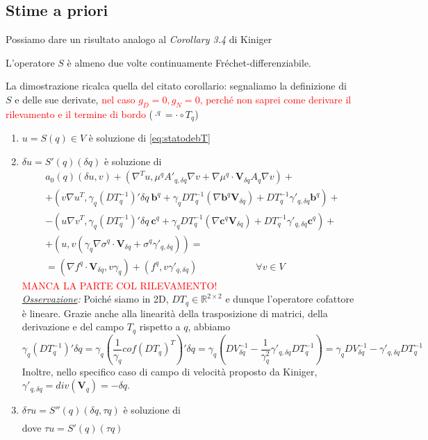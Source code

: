 \subsection{Stime a priori}
Possiamo dare un risultato analogo al \emph{Corollary 3.4} di Kiniger
\begin{prop} L'operatore $S$ \`e almeno due volte continuamente Fr\'echet-differenziabile.
\end{prop}
La dimostrazione ricalca quella del citato corollario: segnaliamo la definizione di $S$ e delle sue derivate, \textcolor{red}{nel caso $g_D=0, g_N=0$, perch\'e non saprei come derivare il rilevamento e il termine di bordo} ($\cdot^q = \cdot\circ T_q$)
\begin{enumerate}
 \item $u=S(q)\in V$ \`e soluzione di \eqref{eq:statodebT}

 \item $\delta u=S'(q)(\delta q)$ \`e soluzione di 
	\begin{align*}
	 &a_0(q)(\delta u,v)
	+ (\nabla^Tu,\mu^qA'_{q,\delta q}\nabla v + \nabla\mu^q\cdot \mathbf{V}_{\delta q}A_q\nabla v) + \\
	&+ (v\nabla u^T,\gamma_q(DT^{-1}_q)'\delta q\ \mathbf{b}^q+\gamma_qDT^{-1}_q(\nabla\mathbf{b}^q\mathbf{V}_{\delta q})+DT^{-1}_q\gamma'_{q,\delta q}\mathbf{b}^q) + \\
	&- (u\nabla v^T,\gamma_q(DT^{-1}_q)'\delta q\ \mathbf{c}^q+\gamma_qDT^{-1}_q(\nabla\mathbf{c}^q\mathbf{V}_{\delta q})+DT^{-1}_q\gamma'_{q,\delta q}\mathbf{c}^q) + \\
	&+ (u,v(\gamma_q\nabla\sigma^q\cdot \mathbf{V}_{\delta q} + \sigma^q\gamma'_{q,\delta q})) = \\
	&=  (\nabla f^q\cdot\mathbf{V}_{\delta q}, v\gamma_q) + (f^q,v\gamma'_{q,\delta q})
		\qquad\qquad\qquad\forall v\in V
	\end{align*}
	\textcolor{red}{MANCA LA PARTE COL RILEVAMENTO!}\\
	\qquad\emph{\underline{Osservazione}:} Poich\'e siamo in 2D, $DT_q\in\mathds{R}^{2\times2}$ e dunque l'operatore cofattore \`e lineare. Grazie anche alla linearit\`a della trasposizione di matrici, della derivazione e del campo $T_q$ rispetto a $q$, abbiamo
	$$\gamma_q(DT_q^{-1})'\delta q = \gamma_q\left(\frac{1}{\gamma_q}cof(DT_q)^T\right)'\delta q = \gamma_q \left(DV_{\delta q}^{-1} - \frac{1}{\gamma_q^2}\gamma'_{q,\delta q}DT_q^{-1}\right) = \gamma_q DV_{\delta q}^{-1} - \gamma'_{q,\delta q} DT_q^{-1}$$
	Inoltre, nello specifico caso di campo di velocit\`a proposto da Kiniger, $\gamma'_{q,\delta q} = div(\mathbf{V}_q) = -\delta q$.

 \item $\delta\tau u=S''(q)(\delta q,\tau q)$ \`e soluzione di 
	\begin{align*}
	\end{align*}
	dove $\tau u = S'(q)(\tau q)$
\end{enumerate}
